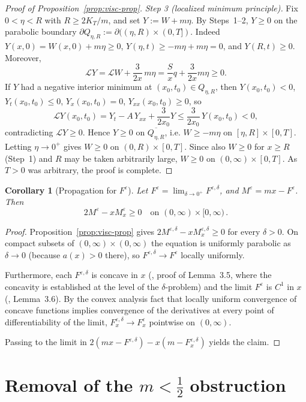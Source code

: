 \documentclass[12pt]{amsart}
\numberwithin{equation}{section}
\theoremstyle{plain}
\newtheorem{corollary}[theorem]{Corollary}
\theoremstyle{definition}
\newcommand{\eps}{\varepsilon}
\newcommand{\Lop}{\mathcal{L}}
\begin{document}
\begin{proof}[Proof of Proposition~\ref{prop:visc-prop}]
	\emph{Step 3 (localized minimum principle).} Fix $0<\eta<R$ with
	$R\ge 2K_T/m$,
	and set $Y:=W+m\eta$. By Steps~1--2, $Y\ge0$ on the parabolic
	boundary $\partial Q_{\eta,R}:=\partial((\eta,R)\times(0,T])$.
	Indeed $Y(x,0)=W(x,0)+m\eta\ge0$,
	$Y(\eta,t)\ge-m\eta+m\eta=0$, and $Y(R,t)\ge0$. Moreover,
	\[
		\Lop Y=\Lop W+\frac{3}{2x}\,m\eta=\frac{S}{x}q+\frac{3}{2x}m\eta\ge0 .
	\]
	If $Y$ had a negative interior minimum at $(x_0,t_0)\in Q_{\eta,R}$, then
	$Y(x_0,t_0)<0$, $Y_t(x_0,t_0)\le0$, $Y_x(x_0,t_0)=0$,
	$Y_{xx}(x_0,t_0)\ge0$, so
	\[
		\Lop Y(x_0,t_0)=Y_t-A\,Y_{xx}+\frac{3}{2x_0}Y
		\le\frac{3}{2x_0}\,Y(x_0,t_0)<0,
	\]
	contradicting $\Lop Y\ge0$. Hence $Y\ge0$ on $\overline{Q_{\eta,R}}$, i.e.
	$W\ge-m\eta$ on $[\eta,R]\times[0,T]$. Letting $\eta\to0^+$ gives $W\ge0$ on
	$(0,R)\times[0,T]$.
	Since also $W\ge0$ for $x\ge R$ (Step~1) and
	$R$ may be taken
	arbitrarily large, $W\ge0$ on $(0,\infty)\times[0,T]$. As $T>0$ was arbitrary,
	the proof is complete.
\end{proof}

\begin{corollary}[Propagation for $F^{\eps}$]\label{cor:eps}
	Let $F^{\eps}=\lim_{\delta\to0^+}F^{\eps,\delta}$, and
	$M^\eps=mx-F^{\eps}$. Then
	\[
		2M^\eps-xM^\eps_x\ge0\quad\text{on }(0,\infty)\times[0,\infty) \,.
	\]
\end{corollary}

\begin{proof}
	Proposition~\ref{prop:visc-prop} gives
	$2M^{\eps,\delta}-xM^{\eps,\delta}_x\ge0$
	for every $\delta>0$.
	On compact subsets of $(0,\infty)\times(0,\infty)$ the
	equation is uniformly parabolic as $\delta\to0$ (because $a(x)>0$ there), so
	$F^{\eps,\delta}\to F^{\eps}$ locally uniformly.

	Furthermore, each $F^{\eps,\delta}$ is concave in $x$
	(\cite{TV}, proof of Lemma~3.5, where the concavity is established at the
	level of the $\delta$-problem)
	and the limit $F^{\eps}$ is $C^1$ in $x$ (\cite{TV}, Lemma~3.6).
	By the convex analysis fact that locally uniform convergence of
	concave functions
	implies convergence of the derivatives at every point of
	differentiability of the limit,
	$F^{\eps, \delta}_x \to F^{\eps}_x$ pointwise on $(0,\infty)$.

	Passing to the limit in
	$2(mx-F^{\eps,\delta})-x(m-F^{\eps,\delta}_x)$ yields the claim.
\end{proof}

\section{Removal of the $m<\tfrac12$ obstruction}
\label{sec:removal}
\end{document}
